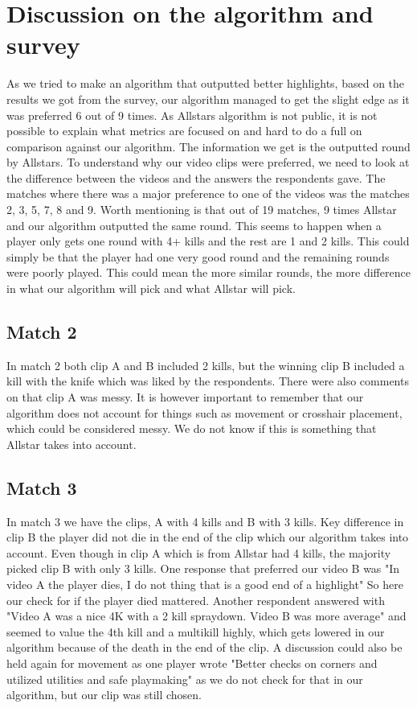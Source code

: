 \section{Discussion on the algorithm and survey}
As we tried to make an algorithm that outputted better highlights, based on the results we got from the survey, our algorithm managed to get the slight edge as it was preferred 6 out of 9 times. As Allstars algorithm is not public, it is not possible to explain what metrics are focused on and hard to do a full on comparison against our algorithm. The information we get is the outputted round by Allstars. To understand why our video clips were preferred, we need to look at the difference between the videos and the answers the respondents gave. The matches where there was a major preference to one of the videos was the matches 2, 3, 5, 7, 8 and 9. Worth mentioning is that out of 19 matches, 9 times Allstar and our algorithm outputted the same round. This seems to happen when a player only gets one round with 4+ kills and the rest are 1 and 2 kills. This could simply be that the player had one very good round and the remaining rounds were poorly played. This could mean the more similar rounds, the more difference in what our algorithm will pick and what Allstar will pick. 
\subsection{Match 2}
In match 2 both clip A and B included 2 kills, but the winning clip B included a kill with the knife which was liked by the respondents. There were also comments on that clip A was messy. It is however important to remember that our algorithm does not account for things such as movement or crosshair placement, which could be considered messy. We do not know if this is something that Allstar takes into account.
\subsection{Match 3}
In match 3 we have the clips, A with 4 kills and B with 3 kills. Key difference in clip B the player did not die in the end of the clip which our algorithm takes into account. Even though in clip A which is from Allstar had 4 kills, the majority picked clip B with only 3 kills. One response that preferred our video B was "In video A the player dies, I do not thing that is a good end of a highlight" So here our check for if the player died mattered. Another respondent answered with "Video A was a nice 4K with a 2 kill spraydown. Video B was more average" and seemed to value the 4th kill and a multikill highly, which gets lowered in our algorithm because of the death in the end of the clip. A discussion could also be held again for movement as one player wrote "Better checks on corners and utilized utilities and safe playmaking" as we do not check for that in our algorithm, but our clip was still chosen.
